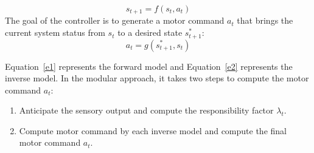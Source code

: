 \begin{equation}
\label{e1}
s_{t+1} = f\left(s_t,a_t\right)
\end{equation}
The goal of the controller is to generate a motor command $a_t$ that
brings the current system status from $s_t$ to a desired state $s^*_{t+1}$:
\begin{equation}
\label{e2}
a_t = g\left({s^*_{t+1},s_t}\right)
\end{equation}

Equation~\ref{e1} represents the forward model and Equation~\ref{e2} represents the inverse model. In the modular approach, it takes two steps to compute the motor command $a_t$:
\begin{enumerate}
\item Anticipate the sensory output and compute the responsibility factor $\lambda_t$.
\item Compute motor command by each inverse model and compute the final motor command $a_t$.
\end{enumerate}



%



